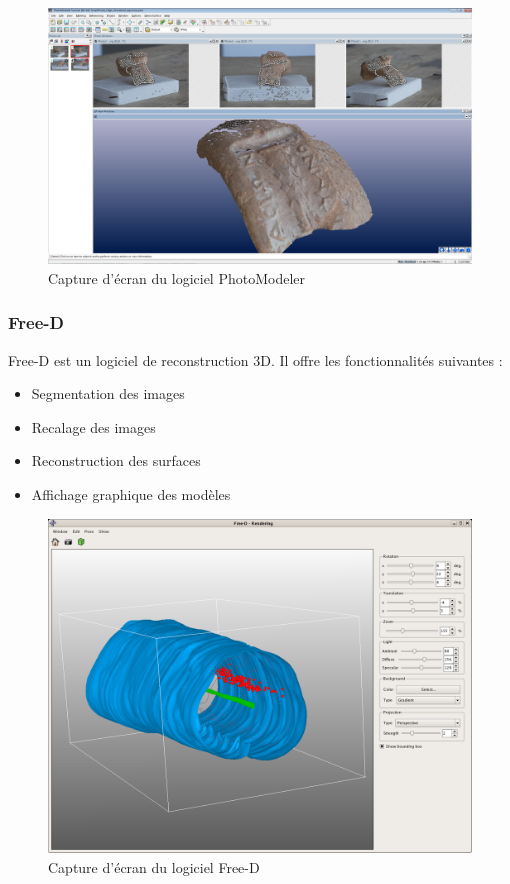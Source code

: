 \documentclass[12pt, openany]{report}
\begin{document}
\begin{figure}[H]
  \center
  \includegraphics[scale=0.2]{figures/photomodeler.jpg}
  \caption{Capture d'écran du logiciel PhotoModeler}
  \label{fig:schema}
\end{figure}



\subsubsection{Free-D}
Free-D est un logiciel de reconstruction 3D.
Il offre les fonctionnalités suivantes :  
\begin{itemize}
\item Segmentation des images
\item Recalage des images
\item Reconstruction des surfaces
\item Affichage graphique des modèles
\end{itemize}

\begin{figure}[H]
  \center
  \includegraphics[scale=0.2]{figures/freeD.png}
  \caption{Capture d'écran du logiciel Free-D}
  \label{fig:schema}
\end{figure}
\end{document}
